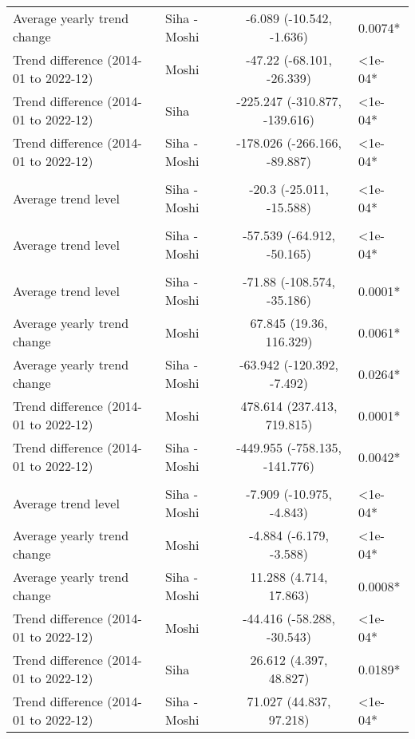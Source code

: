 \begin{longtable}{l|lcl}
Average yearly trend change & Siha - Moshi & -6.089 (-10.542, -1.636) & 0.0074* \\ 
Trend difference (2014-01 to 2022-12) & Moshi & -47.22 (-68.101, -26.339) & <1e-04* \\ 
Trend difference (2014-01 to 2022-12) & Siha & -225.247 (-310.877, -139.616) & <1e-04* \\ 
Trend difference (2014-01 to 2022-12) & Siha - Moshi & -178.026 (-266.166, -89.887) & <1e-04* \\ 
\midrule\addlinespace[2.5pt]
\multicolumn{4}{l}{Neuroses} \\ 
\midrule\addlinespace[2.5pt]
Average trend level & Siha - Moshi & -20.3 (-25.011, -15.588) & <1e-04* \\ 
\midrule\addlinespace[2.5pt]
\multicolumn{4}{l}{Other Cardiovascular Diseases} \\ 
\midrule\addlinespace[2.5pt]
Average trend level & Siha - Moshi & -57.539 (-64.912, -50.165) & <1e-04* \\ 
\midrule\addlinespace[2.5pt]
\multicolumn{4}{l}{Pneumonia, Severe} \\ 
\midrule\addlinespace[2.5pt]
Average trend level & Siha - Moshi & -71.88 (-108.574, -35.186) & 0.0001* \\ 
Average yearly trend change & Moshi & 67.845 (19.36, 116.329) & 0.0061* \\ 
Average yearly trend change & Siha - Moshi & -63.942 (-120.392, -7.492) & 0.0264* \\ 
Trend difference (2014-01 to 2022-12) & Moshi & 478.614 (237.413, 719.815) & 0.0001* \\ 
Trend difference (2014-01 to 2022-12) & Siha - Moshi & -449.955 (-758.135, -141.776) & 0.0042* \\ 
\midrule\addlinespace[2.5pt]
\multicolumn{4}{l}{Poisoning} \\ 
\midrule\addlinespace[2.5pt]
Average trend level & Siha - Moshi & -7.909 (-10.975, -4.843) & <1e-04* \\ 
Average yearly trend change & Moshi & -4.884 (-6.179, -3.588) & <1e-04* \\ 
Average yearly trend change & Siha - Moshi & 11.288 (4.714, 17.863) & 0.0008* \\ 
Trend difference (2014-01 to 2022-12) & Moshi & -44.416 (-58.288, -30.543) & <1e-04* \\ 
Trend difference (2014-01 to 2022-12) & Siha & 26.612 (4.397, 48.827) & 0.0189* \\ 
Trend difference (2014-01 to 2022-12) & Siha - Moshi & 71.027 (44.837, 97.218) & <1e-04* \\ 

\end{longtable}
